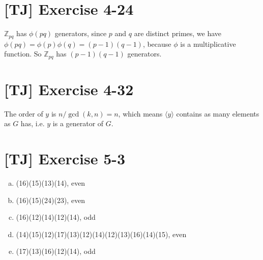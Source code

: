 \documentclass[a4paper,11pt,twocolumn]{article}
\begin{document}
  \section{[TJ] Exercise 4-24}
  $\mathbb{Z}_{pq}$ has $\phi(pq)$ generators, since $p$ and $q$ are distinct primes, we have $\phi(pq) = \phi(p)\phi(q) = (p-1)(q-1)$, because $\phi$ is a multiplicative function. So $\mathbb{Z}_{pq}$ has $(p-1)(q-1)$ generators.

  \section{[TJ] Exercise 4-32}
  The order of $y$ is $n/\gcd(k, n) = n$, which means $\langle y \rangle$ contains as many elements as $G$ has, i.e. $y$ is a generator of $G$.

  \section{[TJ] Exercise 5-3}
  \begin{enumerate}[(a)]
    \item (16)(15)(13)(14), even
    \item (16)(15)(24)(23), even
    \item (16)(12)(14)(12)(14), odd
    \item (14)(15)(12)(17)(13)(12)(14)(12)(13)(16)(14)(15), even
    \item (17)(13)(16)(12)(14), odd
  \end{enumerate}
\end{document}

